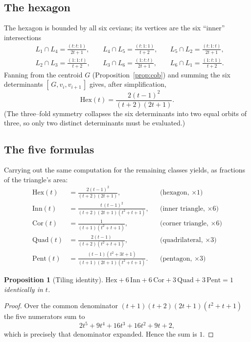 \documentclass[11pt,a4paper,reqno]{amsart}
\newtheorem{proposition}[theorem]{Proposition}
\theoremstyle{definition}
\theoremstyle{remark}
\newcommand{\Hex}{\mathrm{Hex}}
\newcommand{\Cor}{\mathrm{Cor}}
\newcommand{\Inn}{\mathrm{Inn}}
\newcommand{\Quad}{\mathrm{Quad}}
\newcommand{\Pent}{\mathrm{Pent}}
\begin{document}
\subsection{The hexagon}
The hexagon is bounded by all six cevians; its vertices are the six ``inner'' intersections
\[
\begin{aligned}
&L_1\cap L_4=\tfrac{(t:t:1)}{2t+1},\ &&L_4\cap L_5=\tfrac{(t:1:1)}{t+2},\ &&L_5\cap L_2=\tfrac{(t:1:t)}{2t+1},\\
&L_2\cap L_3=\tfrac{(1:1:t)}{t+2},\ &&L_3\cap L_6=\tfrac{(1:t:t)}{2t+1},\ &&L_6\cap L_1=\tfrac{(1:t:1)}{t+2}.
\end{aligned}
\]
Fanning from the centroid $G$ (Proposition~\ref{prop:cob}) and summing the six determinants
$[\,G,v_i,v_{i+1}\,]$ gives, after simplification,
\[
\Hex(t)=\frac{2(t-1)^2}{(t+2)(2t+1)} .
\]
(The three--fold symmetry collapses the six determinants into two equal orbits of three, so only two distinct
determinants must be evaluated.)

\subsection{The five formulas}
Carrying out the same computation for the remaining classes yields, as fractions of the triangle's area:
\begin{align}
\Hex(t)&=\frac{2(t-1)^2}{(t+2)(2t+1)}, & &\text{(hexagon, $\times1$)}\label{e:hex}\\[3pt]
\Inn(t)&=\frac{t\,(t-1)^2}{(t+2)(2t+1)(t^2+t+1)}, & &\text{(inner triangle, $\times6$)}\label{e:inn}\\[3pt]
\Cor(t)&=\frac{1}{(t+1)(t^2+t+1)}, & &\text{(corner triangle, $\times6$)}\label{e:cor}\\[3pt]
\Quad(t)&=\frac{2(t-1)}{(t+2)(t^2+t+1)}, & &\text{(quadrilateral, $\times3$)}\label{e:quad}\\[3pt]
\Pent(t)&=\frac{(t-1)(t^2+3t+1)}{(t+1)(2t+1)(t^2+t+1)}. & &\text{(pentagon, $\times3$)}\label{e:pent}
\end{align}

\begin{proposition}[Tiling identity]\label{prop:tile}
$\Hex+6\,\Inn+6\,\Cor+3\,\Quad+3\,\Pent=1$ identically in $t$.
\end{proposition}
\begin{proof}
Over the common denominator $(t+1)(t+2)(2t+1)(t^2+t+1)$ the five numerators sum to
\[
2t^5+9t^4+16t^3+16t^2+9t+2,
\]
which is precisely that denominator expanded. Hence the sum is $1$.
\end{proof}
\end{document}
